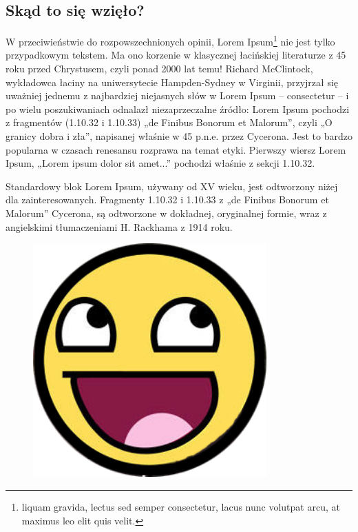\documentclass[a4paper,12pt]{article}
\begin{document}
\subsection{Skąd to się wzięło?}

W przeciwieństwie do rozpowszechnionych opinii, Lorem Ipsum\footnote{liquam gravida, lectus sed semper consectetur, lacus nunc volutpat arcu, at maximus leo elit quis velit.} nie jest tylko przypadkowym tekstem. Ma ono korzenie w klasycznej łacińskiej literaturze z 45 roku przed Chrystusem, czyli ponad 2000 lat temu! Richard McClintock, wykładowca łaciny na uniwersytecie Hampden-Sydney w Virginii, przyjrzał się uważniej jednemu z najbardziej niejasnych słów w Lorem Ipsum – consectetur – i po wielu poszukiwaniach odnalazł niezaprzeczalne źródło: Lorem Ipsum pochodzi z fragmentów (1.10.32 i 1.10.33) „de Finibus Bonorum et Malorum”, czyli „O granicy dobra i zła”, napisanej właśnie w 45 p.n.e. przez Cycerona. Jest to bardzo popularna w czasach renesansu rozprawa na temat etyki. Pierwszy wiersz Lorem Ipsum, „Lorem ipsum dolor sit amet...” pochodzi właśnie z sekcji 1.10.32.

Standardowy blok Lorem Ipsum, używany od XV wieku, jest odtworzony niżej dla zainteresowanych. Fragmenty 1.10.32 i 1.10.33 z „de Finibus Bonorum et Malorum” Cycerona, są odtworzone w dokładnej, oryginalnej formie, wraz z angielskimi tłumaczeniami H. Rackhama z 1914 roku.

\begin{figure}[h!]
\centering 
\includegraphics[width=0.8\textwidth]{emot2.png}
\caption{\label{fig:emot}}
\end{figure}
\end{document}
